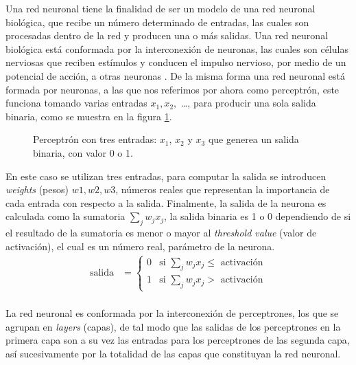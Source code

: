 \documentclass{iccmemoria}
\begin{document}
Una red neuronal tiene la finalidad de ser un modelo de una red neuronal biológica, que recibe un número determinado de entradas, las cuales son procesadas dentro de la red y producen una o más salidas. Una red neuronal biológica está conformada por la interconexión de neuronas, las cuales son células nerviosas que reciben estímulos y conducen el impulso nervioso, por medio de un potencial de acción, a otras neuronas \cite{cayre2002common}. De la misma forma una red neuronal está formada por neuronas, a las que nos referimos por ahora como perceptrón, este funciona tomando varias entradas $ x_{1}, x_{2}, $ \dots, para producir una sola salida binaria, como se muestra en la figura \ref{fig:perceptron}.\\

\begin{figure}[H]
  \centering
  \begin{Large}
  
  \end{Large}
  \caption{Perceptrón con tres entradas: $x_{1}$, $x_{2}$ y $x_{3}$ que generea un salida binaria, con valor 0 o 1.}
  \label{fig:perceptron}
\end{figure}

En este caso se utilizan tres entradas, para computar la salida se introducen \emph{weights} (pesos) $w1, w2, w3$, números reales que representan la importancia de cada entrada con respecto a la salida. Finalmente, la salida de la neurona es calculada como la sumatoria $ \sum_{j}{} w_{j} x_{j}$, la salida binaria es 1 o 0 dependiendo de si el resultado de la sumatoria es menor o mayor al \emph{threshold value} (valor de activación), el cual es un número real, parámetro de la neurona.\\

\begin{equation}
	\begin{split}
	\mbox{salida} & = \begin{cases}
		0 & \mbox{si } \sum_j w_j x_j \leq  \mbox{ activación}\\
		1 & \mbox{si } \sum_j w_j x_j >  \mbox{ activación}
		\end{cases}
	\end{split}
\end{equation}\\


La red neuronal es conformada por la interconexión de perceptrones, los que se agrupan en \emph{layers} (capas), de tal modo que las salidas de los perceptrones en la primera capa son a su vez las entradas para los perceptrones de las segunda capa, así sucesivamente por la totalidad de las capas que constituyan la red neuronal.\\
\end{document}
